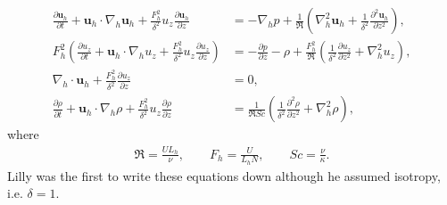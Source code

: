 \begin{align}
\frac{\partial \textbf{u}_{h}}{\partial t} + \textbf{u}_{h}\cdot\nabla_{h}\textbf{u}_{h}+\frac{F_{h}^{2}}{\delta^{2}}u_{z}\frac{\partial \textbf{u}_{h}}{\partial z} &= -\nabla_{h}p + \frac{1}{\Re}\left(\nabla^{2}_{h}\textbf{u}_{h}+\frac{1}{\delta^{2}}\frac{\partial^{2}\textbf{u}_{h}}{\partial z^{2}}\right),\\
F_{h}^{2}\left(\frac{\partial u_{z}}{\partial t} + \textbf{u}_{h}\cdot\nabla_{h}u_{z}+\frac{F_{h}^{2}}{\delta^{2}}u_{z}\frac{\partial u_{z}}{\partial z}\right) &= -\frac{\partial p}{\partial z} - \rho + \frac{F_{h}^{2}}{\Re}\left(\frac{1}{\delta^{2}}\frac{\partial u_{z}}{\partial z^{2}} + \nabla^{2}_{h}u_{z}\right),\\
\nabla_{h}\cdot\textbf{u}_{h} + \frac{F_{h}^{2}}{\delta^{2}}\frac{\partial u_{z}}{\partial z} &=0,\\
\frac{\partial \rho}{\partial t} + \textbf{u}_{h}\cdot\nabla_{h}\rho + \frac{F_{h}^{2}}{\delta^{2}}u_{z}\frac{\partial \rho}{\partial z} &= \frac{1}{\Re Sc}\left(\frac{1}{\delta^{2}}\frac{\partial^{2}\rho}{\partial z^{2}} + \nabla^{2}_{h}\rho\right),
\end{align} 
where 
\begin{align}
\Re = \frac{UL_{h}}{\nu}, \qquad F_{h} = \frac{U}{L_{h}N},\qquad Sc = \frac{\nu}{\kappa}.
\end{align}
Lilly was the first to write these equations down although he assumed isotropy, i.e. $\delta=1$. 

